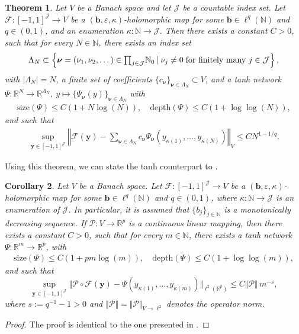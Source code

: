 \documentclass{article}
\numberwithin{equation}{section}
\newcommand{\size}{\mathrm{size}}
\newcommand{\depth}{\mathrm{depth}}
\newcommand{\R}{\mathbb{R}}
\newcommand{\N}{\mathbb{N}}
\newcommand{\cF}{\mathcal{F}}
\newcommand{\cJ}{\mathcal{J}}
\newcommand{\cP}{\mathcal{P}}
\renewcommand{\epsilon}{\varepsilon}
\newcommand{\1}{\mathbbm{1}}
\newtheorem{theorem}{Theorem}[section]
\newtheorem{corollary}[theorem]{Corollary}
\begin{document}
\begin{theorem} \label{thm:be-expansion}
Let $V$ be a Banach space and let $\cJ$ be a  countable index set. Let $\cF: [-1,1]^\cJ \to V$ be a $(\bm{b},\epsilon,\kappa)$-holomorphic map for some $\bm{b}\in \ell^q(\N)$ and $q\in (0,1)$, and an enumeration $\kappa: \N \to \cJ$. Then there exists a constant $C>0$, such that for every $N\in \N$, there exists an index set 
\begin{equation}
\Lambda_N
\subset
\set{
\bm{\nu} = (\nu_1,\nu_2,\dots) \in \textstyle{\prod}_{j\in \cJ} \N_0
\:\vert\:
\nu_j\ne 0 \; \text{for finitely many $j\in \cJ$}
},    
\end{equation}
with $|\Lambda_N|=N$, a finite set of coefficients $\{c_{\bm{\nu}}\}_{\bm{\nu}\in \Lambda_N} \subset V$, and a tanh network $\Psi: \R^N \to \R^{\Lambda_N}$, $y\mapsto \{\Psi_{\bm{\nu}}(y)\}_{\bm{\nu}\in \Lambda_N}$ with
\begin{gather}
\size(\Psi) \le C(1+N\log(N) ), 
\quad
\depth(\Psi) \le C(1+\log\log(N)),
\end{gather}
and such that
\begin{align} \label{eq:be-expansion}
\sup_{\bm{y}\in [-1,1]^\cJ} 
\left\Vert
\cF(\bm{y}) - \sum_{\bm{\nu}\in \Lambda_N} c_{\bm{\nu}} \Psi_{\bm{\nu}}(y_{\kappa(1)},\dots, y_{\kappa(N)})
\right\Vert_{V} 
\le C N^{1-1/q}.
\end{align}
\end{theorem}

Using this theorem, we can state the tanh counterpart to \cite[Corollary 3.33]{LMK1}. 

\begin{corollary} \label{cor:holomorphic-NN}
Let $V$ be a Banach space. Let $\cF: [-1,1]^\cJ \to V$ be a $(\bm{b},\epsilon,\kappa)$-holomorphic map for some $\bm{b}\in \ell^q(\N)$ and $q\in (0,1)$, where $\kappa: \N\to \cJ$ is an enumeration of $\cJ$. In particular, it is assumed that $\{b_{j}\}_{j\in \N}$ is a monotonically decreasing sequence. If $\cP: V \to \R^p$ is a continuous linear mapping, then there exists a constant $C>0$, such that for every $m\in \N$, there exists a tanh network $\Psi: \R^m \to \R^p$, with
\begin{gather}
\size(\Psi) \le C(1+pm\log(m) ), 
\quad
\depth(\Psi) \le C(1+ \log\log(m)),
\end{gather}
and such that
\begin{equation}
\sup_{\bm{y}\in [-1,1]^\cJ} \Vert \cP \circ \cF(\bm{y}) - \Psi(y_{\kappa(1)},\dots, y_{\kappa(m)})\Vert_{\ell^2(\R^p)} \le C \Vert \cP \Vert \,  m^{-s}, 
\end{equation}
where $s := q^{-1} - 1 > 0$ and $\Vert \cP \Vert = \Vert \cP \Vert_{V\to \ell^2}$ denotes the operator norm.
\end{corollary}
\begin{proof}
The proof is identical to the one presented in \cite[Appendix C.18]{LMK1}.
\end{proof}
\end{document}
